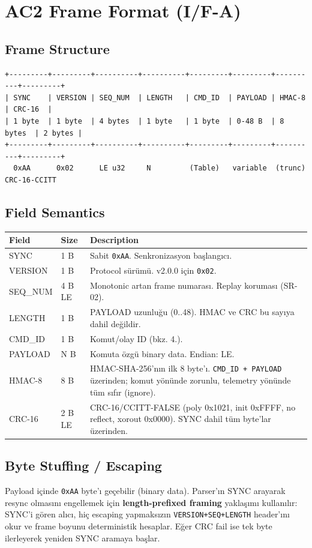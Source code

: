 \documentclass[11pt, a4paper]{article}
\begin{document}
\section{AC2 Frame Format (I/F-A)}

\subsection{Frame Structure}
\begin{lstlisting}
+---------+---------+----------+----------+---------+---------+----------+---------+
| SYNC    | VERSION | SEQ_NUM  | LENGTH   | CMD_ID  | PAYLOAD | HMAC-8   | CRC-16  |
| 1 byte  | 1 byte  | 4 bytes  | 1 byte   | 1 byte  | 0-48 B  | 8 bytes  | 2 bytes |
+---------+---------+----------+----------+---------+---------+----------+---------+
  0xAA      0x02      LE u32     N         (Table)   variable  (trunc)    CRC-16-CCITT
\end{lstlisting}

\subsection{Field Semantics}
\begin{tabularx}{\textwidth}{|l|l|X|}
\hline
\textbf{Field} & \textbf{Size} & \textbf{Description} \\
\hline
SYNC    & 1 B & Sabit \texttt{0xAA}. Senkronizasyon başlangıcı. \\
VERSION & 1 B & Protocol sürümü. v2.0.0 için \texttt{0x02}. \\
SEQ\_NUM & 4 B LE & Monotonic artan frame numarası. Replay koruması (SR-02). \\
LENGTH  & 1 B & PAYLOAD uzunluğu (0..48). HMAC ve CRC bu sayıya dahil değildir. \\
CMD\_ID & 1 B & Komut/olay ID (bkz. 4.). \\
PAYLOAD & N B & Komuta özgü binary data. Endian: LE. \\
HMAC-8  & 8 B & HMAC-SHA-256'nın ilk 8 byte'ı. \texttt{CMD\_ID + PAYLOAD} üzerinden; komut yönünde zorunlu, telemetry yönünde tüm sıfır (ignore). \\
CRC-16  & 2 B LE & CRC-16/CCITT-FALSE (poly 0x1021, init 0xFFFF, no reflect, xorout 0x0000). SYNC dahil tüm byte'lar üzerinden. \\
\hline
\end{tabularx}

\subsection{Byte Stuffing / Escaping}
Payload içinde \texttt{0xAA} byte'ı geçebilir (binary data). Parser'ın SYNC arayarak resync olmasını engellemek için \textbf{length-prefixed framing} yaklaşımı kullanılır: SYNC'i gören alıcı, hiç escaping yapmaksızın \texttt{VERSION+SEQ+LENGTH} header'ını okur ve frame boyunu deterministik hesaplar. Eğer CRC fail ise tek byte ilerleyerek yeniden SYNC aramaya başlar.
\end{document}
